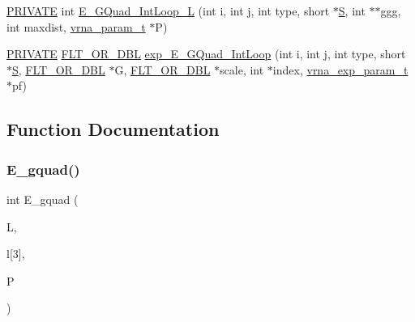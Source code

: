\begin{DoxyCompactItemize}
\item 
\mbox{\hyperlink{group__utils_ga5e151c615eda34903514212f05a5ccf8}{P\+R\+I\+V\+A\+TE}} int \mbox{\hyperlink{group__gquads_ga5a213ee0c675b416666691f19d430610}{E\+\_\+\+G\+Quad\+\_\+\+Int\+Loop\+\_\+L}} (int i, int j, int type, short $\ast$\mbox{\hyperlink{group__energy__parameters__rw_gga7bf2bb363bcf5ce50d60255d256e5682af1ce01387d2348f8b858721a7db81670}{S}}, int $\ast$$\ast$ggg, int maxdist, \mbox{\hyperlink{group__energy__parameters_ga8a69ca7d787e4fd6079914f5343a1f35}{vrna\+\_\+param\+\_\+t}} $\ast$P)
\item 
\mbox{\hyperlink{group__utils_ga5e151c615eda34903514212f05a5ccf8}{P\+R\+I\+V\+A\+TE}} \mbox{\hyperlink{group__data__structures_ga31125aeace516926bf7f251f759b6126}{F\+L\+T\+\_\+\+O\+R\+\_\+\+D\+BL}} \mbox{\hyperlink{group__gquads_ga6b9e82d893f4111654f7c640950d7ced}{exp\+\_\+\+E\+\_\+\+G\+Quad\+\_\+\+Int\+Loop}} (int i, int j, int type, short $\ast$\mbox{\hyperlink{group__energy__parameters__rw_gga7bf2bb363bcf5ce50d60255d256e5682af1ce01387d2348f8b858721a7db81670}{S}}, \mbox{\hyperlink{group__data__structures_ga31125aeace516926bf7f251f759b6126}{F\+L\+T\+\_\+\+O\+R\+\_\+\+D\+BL}} $\ast$G, \mbox{\hyperlink{group__data__structures_ga31125aeace516926bf7f251f759b6126}{F\+L\+T\+\_\+\+O\+R\+\_\+\+D\+BL}} $\ast$scale, int $\ast$index, \mbox{\hyperlink{group__energy__parameters_ga01d8b92fe734df8d79a6169482c7d8d8}{vrna\+\_\+exp\+\_\+param\+\_\+t}} $\ast$pf)
\end{DoxyCompactItemize}


\subsection{Function Documentation}
\mbox{\label{group__gquads_gaa6c187f30e29d3aa29c5b537d0f7293f}} 
\subsubsection{\texorpdfstring{E\+\_\+gquad()}{E\_gquad()}}
{\footnotesize\ttfamily int E\+\_\+gquad (\begin{DoxyParamCaption}\item[{int}]{L,  }\item[{int}]{l\mbox{[}3\mbox{]},  }\item[{\mbox{\hyperlink{group__energy__parameters_ga8a69ca7d787e4fd6079914f5343a1f35}{vrna\+\_\+param\+\_\+t}} $\ast$}]{P }\end{DoxyParamCaption})}



